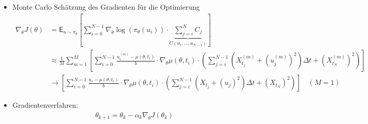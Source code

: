\documentclass[a4paper, 12pt]{scrartcl}
\begin{document}
\begin{beispiel}
\begin{itemize}
        \item[6.] Monte Carlo Schätzung des Gradienten für die Optimierung
        \begin{align*}
            \nabla_{\theta} J(\theta)
            &=
            \mathsf{E}_{u \sim \pi_{\theta}}
            \left[
                \sum_{i=0}^{N-1}
                \nabla_{\theta}
                \log(\pi_{\theta}(u_{i}))
                \cdot
                \underbrace{
                    \sum_{j=i}^{N} C_j
                }_{C(u_i, \ldots, u_{N-1})}
            \right] 
            \\       
            &\approx
            \frac{1}{M} \sum_{m=1}^M
            \left[
                \sum_{i=0}^{N-1}
                \frac{u_{i}^{(m)} - \mu(\theta,t_i)}{b} 
                \cdot \nabla_{\theta} \mu(\theta,t_i)
                \cdot 
                \left(
                    \sum_{j=i}^{N-1}
                    \left(
                        X_{t_j}^{(m)} + (u_{j}^{(m)})^2
                    \right) \Delta t 
                    + 
                    \left(X_{t_N}^{(m)}\right)^2
                \right)
            \right]
            \\
            &\rightarrow 
            \left[
                \sum_{i=0}^{N-1}
                \frac{u_{i} - \mu(\theta,t_i)}{b} 
                \cdot \nabla_{\theta} \mu(\theta,t_i)
                \cdot 
                \left(
                    \sum_{j=i}^{N-1}
                    \left(
                        X_{t_j} + (u_{j})^2
                    \right) \Delta t 
                    + 
                    \left(X_{t_N}\right)^2
                \right)
            \right]
            \quad
            (M=1)
        \end{align*}

        \item[7.] Gradientenverfahren:
        \begin{align*}
            \theta_{k+1} = \theta_k - \alpha_k \nabla_{\theta} J(\theta_k)
        \end{align*}
    \end{itemize}
\end{beispiel}
\end{document}
